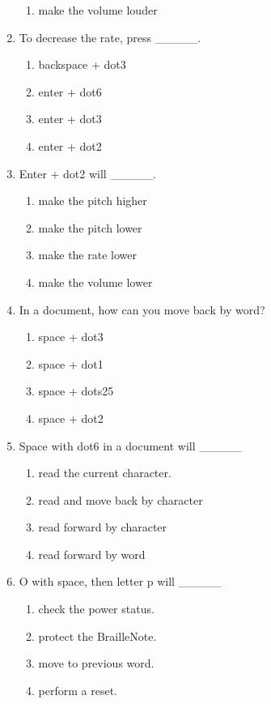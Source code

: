 \documentclass[10pt,letterpaper,twoside]{report}
\begin{document}
\begin{enumerate}
\begin{enumerate}
		      \item make the volume louder
	      \end{enumerate}
	\item To decrease the rate, press \_\_\_\_\_.
	      \begin{enumerate}
		      \item backspace + dot3
		      \item enter + dot6
		      \item enter + dot3
		      \item enter + dot2
	      \end{enumerate}
	\item Enter + dot2 will \_\_\_\_\_.
	      \begin{enumerate}
		      \item make the pitch higher
		      \item make the pitch lower
		      \item make the rate lower
		      \item make the volume lower
	      \end{enumerate}
	\item In a document, how can you move back by word?
	      \begin{enumerate}
		      \item space + dot3
		      \item space + dot1
		      \item space + dots25
		      \item space + dot2
	      \end{enumerate}
	\item Space with dot6 in a document will \_\_\_\_\_
	      \begin{enumerate}
		      \item read the current character.
		      \item read and move back by character
		      \item read forward by character
		      \item read forward by word
	      \end{enumerate}
	\item O with space, then letter p will \_\_\_\_\_
	      \begin{enumerate}
		      \item check the power status.
		      \item protect the BrailleNote.
		      \item move to previous word.
		      \item perform a reset.
	      \end{enumerate}
\end{enumerate}
\end{document}
